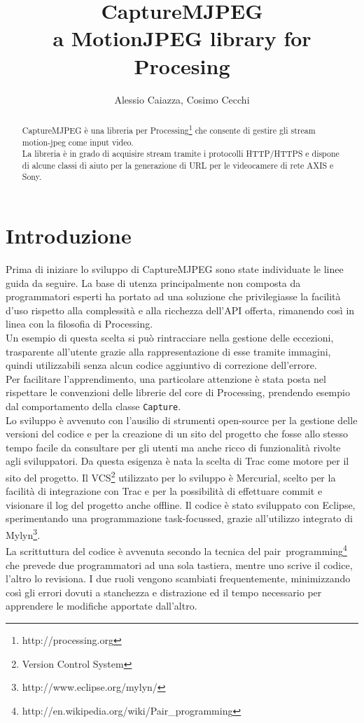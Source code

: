 \documentclass[a4paper,11pt]{article}
\author{Alessio Caiazza, Cosimo Cecchi}
\title{\textbf{CaptureMJPEG}\\ a MotionJPEG library for Procesing}
\begin{document}
\maketitle

\newcommand{\reffigura}[1]{
  Figura \ref{#1}
}

\begin{abstract}
CaptureMJPEG è una libreria per
Processing\footnote{http://processing.org} che consente di gestire gli
stream motion-jpeg come input video.\\
La libreria è in grado di acquisire stream tramite i protocolli
\mbox{HTTP/HTTPS} e dispone di alcune classi di aiuto per la 
generazione di URL per le videocamere di rete AXIS e Sony.  
\end{abstract}
\tableofcontents


\section{Introduzione}
\label{sec:introduzione}
Prima di iniziare lo sviluppo di CaptureMJPEG sono state individuate
le linee guida da seguire.
La base di utenza principalmente non composta da programmatori esperti
ha portato ad una soluzione che privilegiasse la facilit\`a d'uso
rispetto alla complessit\`a e alla ricchezza dell'API offerta,
rimanendo così in linea con la filosofia di Processing.\\
Un esempio di questa scelta si pu\`o rintracciare nella gestione delle
eccezioni, trasparente all'utente grazie alla rappresentazione di esse
tramite immagini, quindi utilizzabili senza alcun codice aggiuntivo di
correzione dell'errore.\\
Per facilitare l'apprendimento, una particolare attenzione \`e stata
posta nel rispettare le convenzioni delle librerie del core di
Processing, prendendo esempio dal comportamento della classe
\texttt{Capture}.\\
Lo sviluppo è avvenuto con l'ausilio di strumenti open-source per la
gestione delle versioni del codice e per la creazione di un sito del 
progetto che fosse allo stesso tempo facile da consultare per gli utenti ma
anche ricco di funzionalit\`a rivolte agli sviluppatori. Da questa
esigenza \`e nata la scelta di Trac come motore per il sito del
progetto. Il VCS\footnote{Version Control System} utilizzato per lo
sviluppo \`e Mercurial, scelto per la facilit\`a di integrazione con 
Trac e per la possibilit\`a di effettuare commit e visionare il log
del progetto anche offline.
Il codice \`e stato sviluppato con Eclipse, sperimentando una 
programmazione task-focussed, grazie all'utilizzo integrato di
Mylyn\footnote{http://www.eclipse.org/mylyn/}.\\
La scrittuttura del codice è avvenuta secondo la tecnica del
pair~programming\footnote{http://en.wikipedia.org/wiki/Pair\_programming}
che prevede due programmatori ad una sola tastiera, mentre uno scrive
il codice, l'altro lo revisiona. I due ruoli vengono scambiati
frequentemente, minimizzando così gli errori dovuti a stanchezza e
distrazione ed il tempo necessario per apprendere le modifiche
apportate dall'altro.
\end{document}
